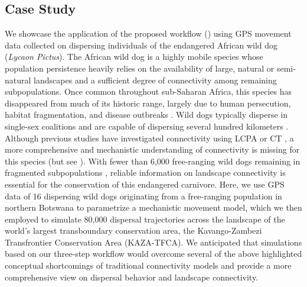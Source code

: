 \documentclass[abstract=on,10pt,a4paper,bibliography=totocnumbered]{article}
\begin{document}
\subsection{Case Study}
We showcase the application of the proposed workflow ()
using GPS movement data collected on dispersing individuals of the endangered
African wild dog (\textit{Lycaon Pictus}). The African wild dog is a highly
mobile species whose population persistence heavily relies on the availability
of large, natural or semi-natural landscapes and a sufficient degree of
connectivity among remaining subpopulations. Once common throughout sub-Saharan
Africa, this species has disappeared from much of its historic range, largely
due to human persecution, habitat fragmentation, and disease outbreaks
\citep{Woodroffe.2012}. Wild dogs typically disperse in single-sex coalitions
\citep{McNutt.1996, Behr.2020} and are capable of dispersing several hundred
kilometers \citep{DaviesMostert.2012, Masenga.2016, Cozzi.2020}. Although
previous studies have investigated connectivity using LCPA \citep{Hofmann.2021}
or CT \citep{Brennan.2020}, a more comprehensive and mechanistic understanding
of connectivity is missing for this species (but see \citealp{Creel.2020}). With
fewer than 6,000 free-ranging wild dogs remaining in fragmented subpopulations
\citep{Woodroffe.2012}, reliable information on landscape connectivity is
essential for the conservation of this endangered carnivore. Here, we use GPS
data of 16 dispersing wild dogs originating from a free-ranging population in
northern Botswana to parametrize a mechanistic movement model, which we then
employed to simulate 80,000 dispersal trajectories across the landscape of the
world's largest transboundary conservation area, the Kavango-Zambezi
Transfrontier Conservation Area (KAZA-TFCA). We anticipated that simulations
based on our three-step workflow would overcome several of the above highlighted
conceptual shortcomings of traditional connectivity models and provide a more
comprehensive view on dispersal behavior and landscape connectivity.
\end{document}
